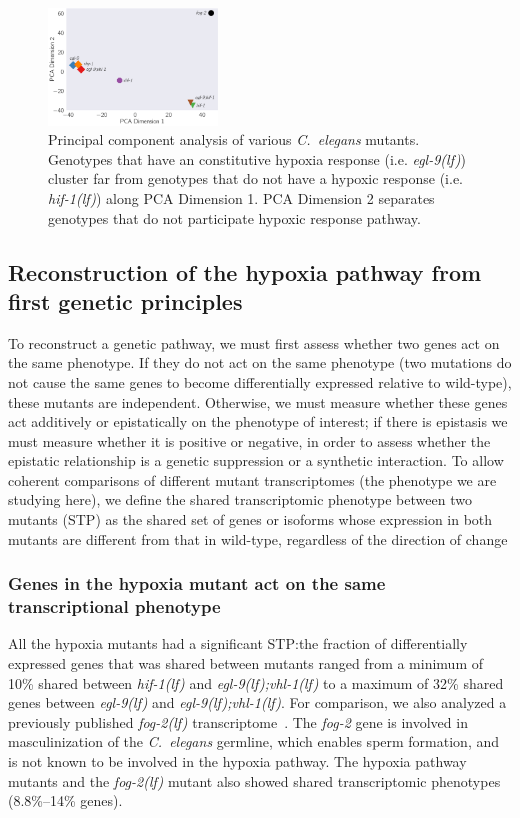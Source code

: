 \documentclass[9pt,twocolumn,twoside]{pnas-new}
\newcommand{\cel}{\emph{C.~elegans}}
\newcommand{\gene}[1]{\mbox{\emph{#1}}}
\newcommand{\fog}{\gene{fog-2(lf)}}
\newcommand{\egl}{\gene{egl-9(lf)}}
\newcommand{\eglvhl}{\gene{egl-9(lf);vhl-1(lf)}}
\newcommand{\hif}{\gene{hif-1(lf)}}
\begin{document}
\begin{figure}[tbhp]
  \centering
  \includegraphics[width=0.4\textwidth]{../figs/pca.pdf}
  \caption{
    Principal component analysis of various \cel{} mutants. Genotypes that have
    an constitutive hypoxia response (i.e. \egl{}) cluster far from genotypes
    that do not have a hypoxic response (i.e. \hif{}) along PCA Dimension 1. PCA
    Dimension 2 separates genotypes that do not participate hypoxic response
    pathway.
  }
\label{fig:pca}
\end{figure}

\subsection*{Reconstruction of the hypoxia pathway from first genetic principles}
\label{sec:reconstruct}
To reconstruct a genetic pathway, we must first assess whether two genes act on
the same phenotype. If they do not act on the same phenotype (two mutations do
not cause the same genes to become differentially expressed relative to
wild-type), these mutants are independent. Otherwise, we must measure whether
these genes act additively or epistatically on the phenotype of interest; if
there is epistasis we must measure whether it is positive or negative, in order
to assess whether the epistatic relationship is a genetic suppression or a
synthetic interaction. To allow coherent comparisons of different mutant
transcriptomes (the phenotype we are studying here), we define the shared
transcriptomic phenotype between two mutants (STP) as the shared set of genes or
isoforms whose expression in both mutants are different from that in wild-type,
regardless of the direction of change

\subsubsection*{Genes in the hypoxia mutant act on the same transcriptional
                phenotype}
\label{sec:phenotypes}
All the hypoxia mutants had a significant STP:\@ the fraction of differentially
expressed genes that was shared between mutants ranged from a minimum of 10\%
shared between \hif{} and \eglvhl{} to a maximum of 32\% shared genes between
\egl{} and \eglvhl{}. For comparison, we also analyzed a previously published
\fog{} transcriptome~\cite{Angeles-Albores2016a}. The \gene{fog-2} gene is
involved in masculinization of the \cel{} germline, which enables sperm
formation, and is not known to be involved in the hypoxia pathway. The hypoxia
pathway mutants and the \fog{} mutant also showed shared transcriptomic
phenotypes (8.8\%--14\% genes).
\end{document}
